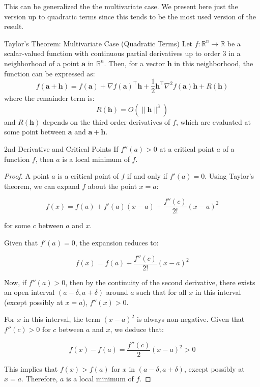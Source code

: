 This can be generalized the the multivariate case.  We present here just the version up to quadratic terms since this tends to be the most used version of the result.
\begin{theorem}{Taylor's Theorem: Multivariate Case (Quadratic Terms)}{}
Let \( f\colon \mathbb{R}^n \rightarrow \mathbb{R} \) be a scalar-valued function with continuous partial derivatives up to order 3 in a neighborhood of a point \( \mathbf{a} \) in \( \mathbb{R}^n \). Then, for a vector \( \mathbf{h} \) in this neighborhood, the function can be expressed as:
\[ 
f(\mathbf{a} + \mathbf{h}) = f(\mathbf{a}) + \nabla f(\mathbf{a})^\top \mathbf{h} + \frac{1}{2} \mathbf{h}^\top \nabla^2 f(\mathbf{a}) \mathbf{h} + R(\mathbf{h})
\]
where the remainder term is:
\[ 
R(\mathbf{h}) = O(\| \mathbf{h} \|^3)
\]
and \( R(\mathbf{h}) \) depends on the third order derivatives of \( f \), which are evaluated at some point between \( \mathbf{a} \) and \( \mathbf{a} + \mathbf{h} \).
\end{theorem}




\begin{lemma}{2nd Derivative and Critical Points}{}
If \( f''(a) > 0 \) at a critical point \( a \) of a function \( f \), then \( a \) is a local minimum of \( f \).
\end{lemma}

\begin{proof}
A point \( a \) is a critical point of \( f \) if and only if \( f'(a) = 0 \). Using Taylor's theorem, we can expand \( f \) about the point \( x = a \):

\[
f(x) = f(a) + f'(a)(x - a) + \frac{f''(c)}{2!}(x - a)^2
\]

for some \( c \) between \( a \) and \( x \).

Given that \( f'(a) = 0 \), the expansion reduces to:

\[
f(x) = f(a) + \frac{f''(c)}{2!}(x - a)^2
\]

Now, if \( f''(a) > 0 \), then by the continuity of the second derivative, there exists an open interval \( (a - \delta, a + \delta) \) around \( a \) such that for all \( x \) in this interval (except possibly at \( x = a \)), \( f''(x) > 0 \).

For \( x \) in this interval, the term \((x - a)^2\) is always non-negative. Given that \( f''(c) > 0 \) for \( c \) between \( a \) and \( x \), we deduce that:

\[
f(x) - f(a) = \frac{f''(c)}{2}(x - a)^2 > 0
\]

This implies that \( f(x) > f(a) \) for \( x \) in \( (a - \delta, a + \delta) \), except possibly at \( x = a \). Therefore, \( a \) is a local minimum of \( f \).
\end{proof}

